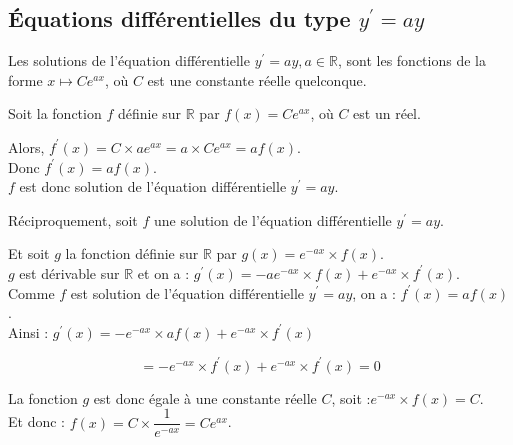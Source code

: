 \subsection{Équations différentielles du type $y^{\prime}=a y$}

\begin{bprop}
	Les solutions de l'équation différentielle $y^{\prime}=a y, a \in \mathbb{R}$, sont les fonctions de la forme $x \longmapsto C e^{a x}$, où $C$ est une constante réelle quelconque.
\end{bprop}

\begin{bdemo}
	\begin{itemDem}
		\item Soit la fonction $f$ définie sur $\mathbb{R}$ par $f(x)=C e^{a x}$, où $C$ est un réel.
	\end{itemDem}
	
	Alors, $f^{\prime}(x)=C \times a e^{a x}=a \times C e^{a x}=a f(x)$.\\
	Donc $f^{\prime}(x)=a f(x)$.\\
	$f$ est donc solution de l'équation différentielle $y^{\prime}=a y$.
	
	\begin{itemDem}
		\item Réciproquement, soit $f$ une solution de l'équation différentielle $y^{\prime}=a y$.
	\end{itemDem}
	
	Et soit $g$ la fonction définie sur $\mathbb{R}$ par $g(x)=e^{-a x} \times f(x)$.\\
	$g$ est dérivable sur $\mathbb{R}$ et on a : $g^{\prime}(x)=-a e^{-a x} \times f(x)+e^{-a x} \times f^{\prime}(x)$.\\
	Comme $f$ est solution de l'équation différentielle $y^{\prime}=a y$, on a : $f^{\prime}(x)=a f(x)$.\\
	Ainsi : $g^{\prime}(x)=-e^{-a x} \times a f(x)+e^{-a x} \times f^{\prime}(x)$
	
	$$
	=-e^{-a x} \times f^{\prime}(x)+e^{-a x} \times f^{\prime}(x)=0
	$$
	
	La fonction $g$ est donc égale à une constante réelle $C$, soit :$e^{-a x} \times f(x)=C$.\\
	Et donc : $f(x)=C \times \dfrac{1}{e^{-a x}}=C e^{a x}$.
\end{bdemo}

